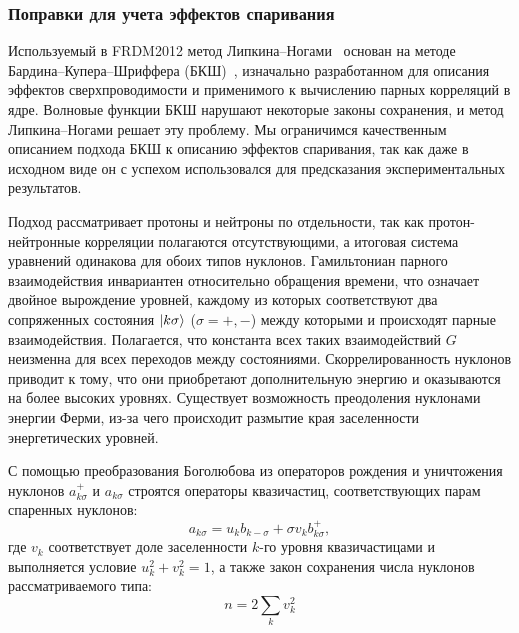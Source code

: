 \subsubsection{Поправки для учета эффектов спаривания}
\label{sec:bcs}
Используемый в FRDM2012 метод Липкина--Ногами~\cite{lipkin1960,nogami1964} основан на методе Бардина--Купера--Шриффера (БКШ)~\cite{bcs1957}, изначально разработанном для описания эффектов сверхпроводимости и применимого к вычислению парных корреляций в ядре. Волновые функции БКШ нарушают некоторые законы сохранения, и метод Липкина--Ногами решает эту проблему. Мы ограничимся качественным описанием подхода БКШ к описанию эффектов спаривания, так как даже в исходном виде он с успехом использовался для предсказания экспериментальных результатов.

Подход рассматривает протоны и нейтроны по отдельности, так как протон-нейтронные корреляции полагаются отсутствующими, а итоговая система уравнений одинакова для обоих типов нуклонов. Гамильтониан парного взаимодействия инвариантен относительно обращения времени, что означает двойное вырождение уровней, каждому из которых соответствуют два сопряженных состояния $\ket{k\sigma}$ ($\sigma = +,-$) между которыми и происходят парные взаимодействия. Полагается, что константа всех таких взаимодействий $G$ неизменна для всех переходов между состояниями. Скоррелированность нуклонов приводит к тому, что они приобретают дополнительную энергию и оказываются на более высоких уровнях. Существует возможность преодоления нуклонами энергии Ферми, из-за чего происходит размытие края заселенности энергетических уровней.

С помощью преобразования Боголюбова из операторов рождения и уничтожения нуклонов $a^+_{k\sigma}$ и $a_{k\sigma}$ строятся операторы квазичастиц, соответствующих парам спаренных нуклонов:
\begin{equation}
a_{k\sigma} = u_k b_{k -\sigma} + \sigma v_k b^+_{k\sigma},
\end{equation}
где $v_k$ соответствует доле заселенности $k$-го уровня квазичастицами и выполняется условие $u^2_k + v^2_k = 1$, а также закон сохранения числа нуклонов рассматриваемого типа:
\begin{equation}
n = 2\sum_k v_k^2
\end{equation}

